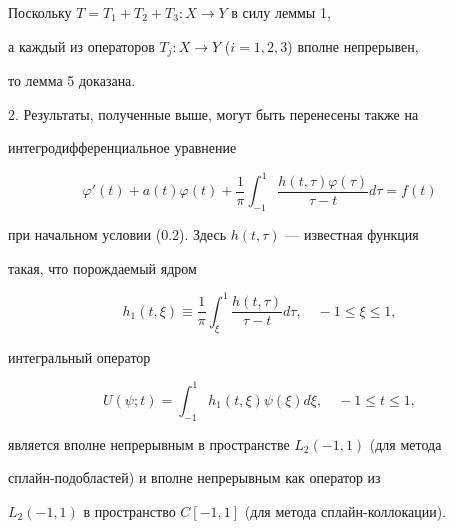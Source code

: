 Поскольку $T=T_1+T_2+T_3:X\to Y $ в силу леммы 1,


а каждый из операторов $T_j:X\to Y$ ($i=1, 2, 3$) вполне непрерывен,


то лемма 5 доказана.





2. Результаты, полученные выше, могут быть перенесены также на


интегродиф\-фе\-рен\-ци\-аль\-ное уравнение


$$


\varphi'(t)+a(t)\varphi(t)+\frac{1}{\pi}\int_{-1}^1\frac{h(t, \tau)


\varphi(\tau)}{\tau-t}d\tau=f(t)


$$


при начальном условии (0.2). Здесь $h(t, \tau)$ --- известная функция


такая, что порождаемый ядром


$$


h_1(t, \xi)\equiv\frac{1}{\pi}\int_{\xi}^1\frac{h(t, \tau)}{\tau-t}d\tau, 


\quad -1\leq\xi\leq 1, 


$$


интегральный оператор


$$


U(\psi;t)=\int_{-1}^1h_1(t, \xi)\psi(\xi)d\xi, \quad -1\leq t\leq 1, 


$$


является вполне непрерывным в пространстве $L_2(-1, 1)$ (для метода


сплайн-подобластей) и вполне непрерывным как оператор из


$L_2(-1, 1)$ в пространство $C[-1, 1]$ (для метода сплайн-коллокации). 








